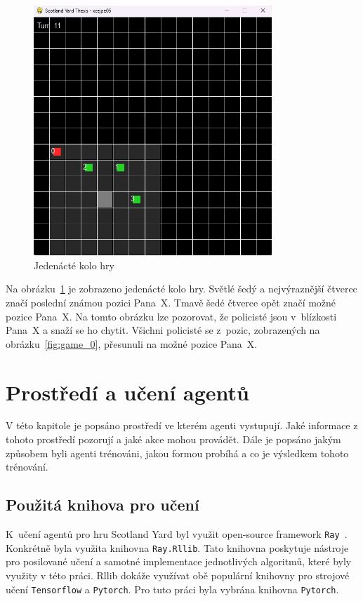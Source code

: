\begin{figure}[H]
	\centering
	\includegraphics[width=0.8\textwidth]{obrazky-figures/game_11}
      \caption{Jedenácté kolo hry}
    \label{fig:game_11}
\end{figure}

Na obrázku~\ref{fig:game_11} je zobrazeno jedenácté kolo hry.
Světlé šedý a nejvýraznější čtverec značí poslední známou pozici Pana~X\@.
Tmavě šedé čtverce opět značí možné pozice Pana~X\@.
Na tomto obrázku lze pozorovat, že policisté jsou v~blízkosti Pana~X a snaží se ho chytit.
Všichni policisté se z~pozic, zobrazených na obrázku~\ref{fig:game_0}, přesunuli na možné pozice Pana~X\@.

\section{Prostředí a učení agentů}
\label{sec:implementace}

V této kapitole je popsáno prostředí ve kterém agenti vystupují.
Jaké informace z tohoto prostředí pozorují a jaké akce mohou provádět.
Dále je popsáno jakým způsobem byli agenti trénováni, jakou formou probíhá a co je výsledkem tohoto trénování.


\subsection{Použitá knihova pro učení}\label{subsec:pouzite-technologie}
K~učení agentů pro hru Scotland Yard byl využit open-source framework \texttt{Ray}~\cite{Ray,liang2018rllib}.
Konkrétně byla využita knihovna \texttt{Ray.Rllib}.
Tato knihovna poskytuje nástroje pro posilované učení a samotné implementace jednotlivých algoritmů, které byly využity v této práci.
Rllib dokáže využívat obě populární knihovny pro strojové učení \texttt{Tensorflow} a \texttt{Pytorch}.
Pro tuto práci byla vybrána knihovna \texttt{Pytorch}.

